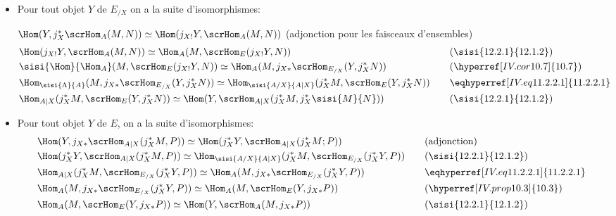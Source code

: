 \documentclass[10pt]{../fichiers-configuration-latex/smfart}
\begin{document}
\begin{itemize}
\item[Démontrons \sisi{d}{b}).] Pour tout objet $Y$ de $E_{/X}$ on a la suite
d'isomorphismes:

$\Hom(Y,j^{\ast}_X\scrHom_A(M,N))\simeq \Hom(j_{X!}Y,\scrHom_A
(M,N))$ (adjonction pour les faisceaux d'ensembles)
\begin{alignat*}{2}
& \Hom(j_{X!}Y,\scrHom_A(M,N))\simeq \Hom_A (M,\scrHom_E(j_{X!}Y,
N))
&\quad& (\sisi{12.2.1}{12.1.2})\\
& \sisi{\Hom}{\Hom_A}(M, \scrHom_E(j_{X!}Y,N))\simeq \Hom_A
(M,j_{X\ast}\scrHom_{E_{/X}}(Y,j^{\ast}_XN)) && (\hyperref[IV.cor10.7]{10.7})\\
& \Hom_{\sisi{\Lambda}{A}}(M, j_{X\ast}\scrHom_{E_{/X}}(Y, j^{\ast}_XN))\simeq
\Hom_{\sisi{A/X}{A|X}}(j^{\ast}_XM, \scrHom_E (Y,j^{\ast}_XN)) && \eqhyperref[IV.eq11.2.2.1]{11.2.2.1}\\
 & \Hom_{A| X}(j^{\ast}_XM, \scrHom_E (Y, j^{\ast}_XN))\simeq
\Hom(Y,\scrHom_{A| X}(j^{\ast}_X M, j^{\ast}_X\sisi{M}{N})) && (\sisi{12.2.1}{12.1.2})
\end{alignat*}\pageoriginale

\item[Démontrons c).] Pour tout objet $Y$ de $E$, on a la suite
d'isomorphismes:
\begin{alignat*}{2}
& \Hom(Y,j_{X\ast}\scrHom_{A| X}(j^{\ast}_XM,P))\simeq
\Hom(j^{\ast}_XY, \scrHom_{A| X}(j^{\ast}_XM; P)) &\quad&
\text{(adjonction)}\\
&\Hom (j^{\ast}_XY, \scrHom_{A| X}(j^{\ast}_XM, P))\simeq
\Hom_{\sisi{A/X}{A|X}}(j^{\ast}_XM, \scrHom_{E_{/X}}(j^{\ast}_XY,P)) && (\sisi{12.2.1}{12.1.2})\\
&\Hom_{A| X}(j^{\ast}_XM, \scrHom_{E_{/X}}(j^{\ast}_XY,P))\simeq
\Hom_A(M, j_{X\ast}\scrHom_{E_{/X}}(j^{\ast}_XY,P)) && \eqhyperref[IV.eq11.2.2.1]{11.2.2.1}\\
&\Hom_A(M,j_{X\ast}\scrHom_{E_{/X}}(j^{\ast}_XY,P))\simeq
\Hom_A(M,\scrHom_E(Y, j_{X\ast}P)) && (\hyperref[IV.prop10.3]{10.3})\\
&\Hom_A(M,\scrHom_E(Y, j_{X\ast}P))\simeq \Hom(Y,
\scrHom_A(M,j_{X\ast}P)) && (\sisi{12.2.1}{12.1.2})
\end{alignat*}


\end{itemize}
\end{document}
